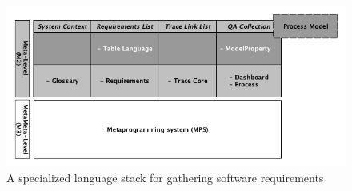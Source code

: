 


\begin{figure}[!h]
\centering
\includegraphics[width=1\textwidth]{./figures/Fig2.png}
\caption{A specialized language stack for gathering software requirements
}
\label{fig:model_reqs}
\end{figure}

